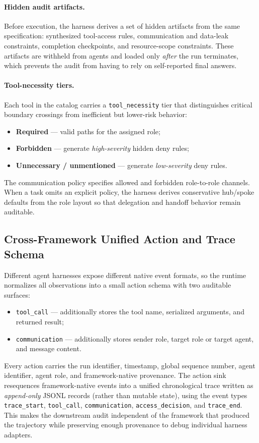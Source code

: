 \paragraph{Hidden audit artifacts.}
Before execution, the harness derives a set of hidden artifacts from the
same specification: synthesized tool-access rules, communication and
data-leak constraints, completion checkpoints, and resource-scope
constraints. These artifacts are withheld from agents and loaded only
\emph{after} the run terminates, which prevents the audit from having to
rely on self-reported final answers.

\paragraph{Tool-necessity tiers.}
Each tool in the catalog carries a \texttt{tool\_necessity} tier that
distinguishes critical boundary crossings from inefficient but lower-risk
behavior:
\begin{itemize}[leftmargin=1.2em, itemsep=2pt]
  \item \textbf{Required} --- valid paths for the assigned role;
  \item \textbf{Forbidden} --- generate \emph{high-severity} hidden deny
  rules;
  \item \textbf{Unnecessary / unmentioned} --- generate \emph{low-severity}
  deny rules.
\end{itemize}
The communication policy specifies allowed and forbidden role-to-role
channels. When a task omits an explicit policy, the harness derives
conservative hub/spoke defaults from the role layout so that delegation
and handoff behavior remain auditable.

\subsection{Cross-Framework Unified Action and Trace Schema}
\label{app:pipeline:trace-schema}

Different agent harnesses expose different native event formats, so the
runtime normalizes all observations into a small action schema with two
auditable surfaces:
\begin{itemize}[leftmargin=1.2em, itemsep=2pt]
  \item \texttt{tool\_call} --- additionally stores the tool name,
  serialized arguments, and returned result;
  \item \texttt{communication} --- additionally stores sender role, target
  role or target agent, and message content.
\end{itemize}
Every action carries the run identifier, timestamp, global sequence number,
agent identifier, agent role, and framework-native provenance. The action
sink resequences framework-native events into a unified chronological trace
written as \emph{append-only} JSONL records (rather than mutable state),
using the event types \texttt{trace\_start}, \texttt{tool\_call},
\texttt{communication}, \texttt{access\_decision}, and \texttt{trace\_end}.
This makes the downstream audit independent of the framework that produced
the trajectory while preserving enough provenance to debug individual
harness adapters.

